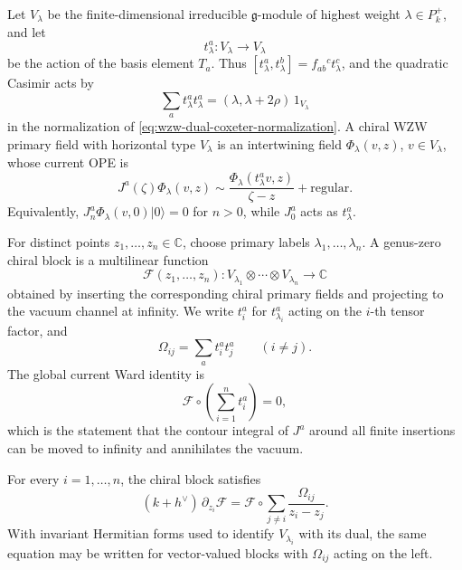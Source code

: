 Let \(V_\lambda\) be the finite-dimensional irreducible \(\mathfrak g\)-module
of highest weight \(\lambda\in P_k^+\), and let
\[
  t_\lambda^a:V_\lambda\to V_\lambda
\]
be the action of the basis element \(T_a\).  Thus
\([t_\lambda^a,t_\lambda^b]=f_{ab}{}^c t_\lambda^c\), and the quadratic
Casimir acts by
\[
  \sum_a t_\lambda^a t_\lambda^a
  =
  (\lambda,\lambda+2\rho)\,1_{V_\lambda}
\]
in the normalization of \eqref{eq:wzw-dual-coxeter-normalization}.  A chiral
WZW primary field with horizontal type \(V_\lambda\) is an intertwining field
\(\Phi_\lambda(v,z)\), \(v\in V_\lambda\), whose current OPE is
\begin{equation}
  J^a(\zeta)\Phi_\lambda(v,z)
  \sim
  \frac{\Phi_\lambda(t_\lambda^a v,z)}{\zeta-z}
  +\text{regular}.
  \label{eq:wzw-primary-current-ope}
\end{equation}
Equivalently, \(J_n^a\Phi_\lambda(v,0)|0\rangle=0\) for \(n>0\), while
\(J_0^a\) acts as \(t_\lambda^a\).

For distinct points \(z_1,\ldots,z_n\in\mathbb C\), choose primary labels
\(\lambda_1,\ldots,\lambda_n\).  A genus-zero chiral block is a multilinear
function
\[
  \mathcal F(z_1,\ldots,z_n):
  V_{\lambda_1}\otimes\cdots\otimes V_{\lambda_n}\to\mathbb C
\]
obtained by inserting the corresponding chiral primary fields and projecting
to the vacuum channel at infinity.  We write \(t_i^a\) for \(t_{\lambda_i}^a\)
acting on the \(i\)-th tensor factor, and
\begin{equation}
  \Omega_{ij}
  =
  \sum_a t_i^a t_j^a
  \qquad (i\ne j).
  \label{eq:wzw-kz-omega-ij}
\end{equation}
The global current Ward identity is
\begin{equation}
  \mathcal F\circ \left(\sum_{i=1}^n t_i^a\right)=0,
  \label{eq:wzw-global-current-ward}
\end{equation}
which is the statement that the contour integral of \(J^a\) around all finite
insertions can be moved to infinity and annihilates the vacuum.

\begin{theorem}
\label{thm:wzw-kz-equation}
For every \(i=1,\ldots,n\), the chiral block satisfies
\begin{equation}
  (k+h^\vee)\,\partial_{z_i}\mathcal F
  =
  \mathcal F\circ
  \sum_{j\ne i}\frac{\Omega_{ij}}{z_i-z_j}.
  \label{eq:wzw-kz-equation}
\end{equation}
With invariant Hermitian forms used to identify \(V_{\lambda_i}\) with its
dual, the same equation may be written for vector-valued blocks with
\(\Omega_{ij}\) acting on the left.
\end{theorem}

